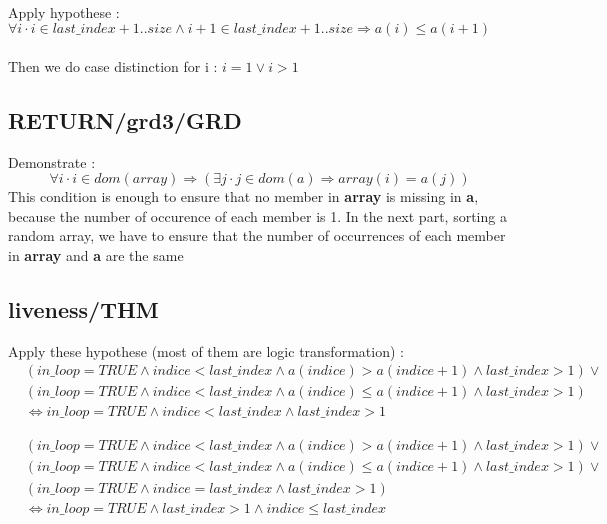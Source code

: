 \paragraph{}
Apply hypothese : \\
$
\forall i \cdot i \in last\_index+1..size \land i+1 \in last\_index+1..size \Rightarrow a(i) \leq a(i+1)
$

\paragraph{}
Then we do case distinction for i : $i=1 \lor i>1$

\subsection{RETURN/grd3/GRD}
Demonstrate : 
$$
\forall i \cdot i \in dom(array) \Rightarrow (\exists j \cdot j \in dom(a) \Rightarrow array(i) = a(j))
$$
This condition is enough to ensure that no member in \textbf{array} is missing in \textbf{a}, because the number of occurence of each member is 1. In the next part, sorting a random array, we have to ensure that the number of occurrences of each member in \textbf{array} and \textbf{a} are the same 

\subsection{liveness/THM}
Apply these hypothese (most of them are logic transformation) :
\begin{align*}
&(in\_loop=TRUE \land indice<last\_index \land a(indice)>a(indice+1) \land last\_index>1) \lor \\
&(in\_loop=TRUE \land indice<last\_index \land a(indice) \leq a(indice+1) \land last\_index>1)  \\
&\Leftrightarrow in\_loop=TRUE \land indice<last\_index \land last\_index>1
\end{align*}

\begin{align*}
&(in\_loop=TRUE \land indice<last\_index \land a(indice)>a(indice+1) \land last\_index>1) \lor \\
&(in\_loop=TRUE \land indice<last\_index \land a(indice) \leq a(indice+1) \land last\_index>1) \lor \\
&(in\_loop=TRUE \land indice=last\_index \land last\_index>1) \\
&\Leftrightarrow in\_loop=TRUE \land last\_index>1 \land indice \leq last\_index
\end{align*}

